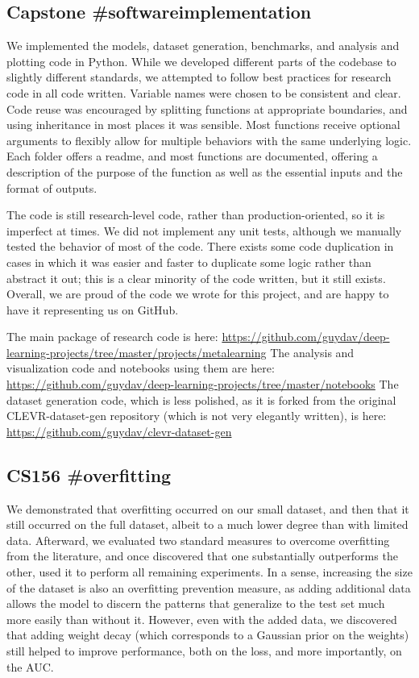 \subsection{Capstone \#softwareimplementation}
We implemented the models, dataset generation, benchmarks, and analysis and plotting code in Python. While we developed different parts of the codebase to slightly different standards, we attempted to follow best practices for research code in all code written. Variable names were chosen to be consistent and clear. Code reuse was encouraged by splitting functions at appropriate boundaries, and using inheritance in most places it was sensible. Most functions receive optional arguments to flexibly allow for multiple behaviors with the same underlying logic. Each folder offers a readme, and most functions are documented, offering a description of the purpose of the function as well as the essential inputs and the format of outputs. 

The code is still research-level code, rather than production-oriented, so it is imperfect at times. We did not implement any unit tests, although we manually tested the behavior of most of the code. There exists some code duplication in cases in which it was easier and faster to duplicate some logic rather than abstract it out; this is a clear minority of the code written, but it still exists. Overall, we are proud of the code we wrote for this project, and are happy to have it representing us on GitHub. 

The main package of research code is here: \url{https://github.com/guydav/deep-learning-projects/tree/master/projects/metalearning}
The analysis and visualization code and notebooks using them are here: \url{https://github.com/guydav/deep-learning-projects/tree/master/notebooks}
The dataset generation code, which is less polished, as it is forked from the original CLEVR-dataset-gen repository (which is not very elegantly written), is here: \url{https://github.com/guydav/clevr-dataset-gen}

\subsection{CS156 \#overfitting}
We demonstrated that overfitting occurred on our small dataset, and then that it still occurred on the full dataset, albeit to a much lower degree than with limited data. Afterward, we evaluated two standard measures to overcome overfitting from the literature, and once discovered that one substantially outperforms the other, used it to perform all remaining experiments. In a sense, increasing the size of the dataset is also an overfitting prevention measure, as adding additional data allows the model to discern the patterns that generalize to the test set much more easily than without it. However, even with the added data, we discovered that adding weight decay (which corresponds to a Gaussian prior on the weights) still helped to improve performance, both on the loss, and more importantly, on the AUC. 


